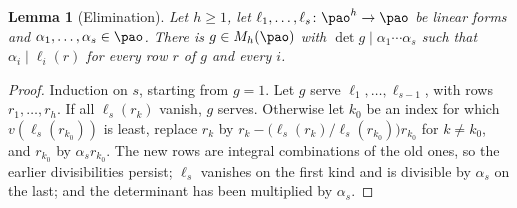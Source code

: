 \documentclass[10pt]{amsart}
\newtheorem{lemma}[theorem]{Lemma}
\theoremstyle{definition}
\theoremstyle{remark}
\begin{document}
\begin{lemma}[Elimination]\label{pa:elim}
Let $h\ge1$, let $\ell_1,\dots,\ell_s\colon\pao^h\to\pao$ be linear forms and
$\alpha_1,\dots,\alpha_s\in\pao$. There is $g\in M_h(\pao)$ with $\det g\mid\alpha_1\cdots\alpha_s$
such that $\alpha_i\mid\ell_i(r)$ for every row $r$ of $g$ and every $i$.
\end{lemma}
\begin{proof}
Induction on $s$, starting from $g=1$. Let $g$ serve $\ell_1,\dots,\ell_{s-1}$, with rows
$r_1,\dots,r_h$. If all $\ell_s(r_k)$ vanish, $g$ serves. Otherwise let $k_0$ be an index for which
$v(\ell_s(r_{k_0}))$ is least, replace $r_k$ by $r_k-\bigl(\ell_s(r_k)/\ell_s(r_{k_0})\bigr)r_{k_0}$
for $k\ne k_0$, and $r_{k_0}$ by $\alpha_sr_{k_0}$. The new rows are integral combinations of the
old ones, so the earlier divisibilities persist; $\ell_s$ vanishes on the first kind and is
divisible by $\alpha_s$ on the last; and the determinant has been multiplied by $\alpha_s$.
\end{proof}
\end{document}
